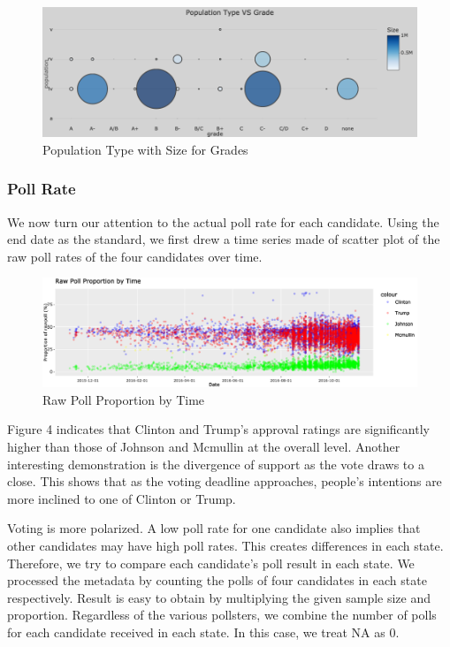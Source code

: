 \documentclass[
  11pt,
]{article}
\begin{document}
\begin{figure}
\centering
\includegraphics{./Figures/popChart.png}
\caption{Population Type with Size for Grades}
\end{figure}

\hypertarget{poll-rate}{%
\subsubsection{Poll Rate}\label{poll-rate}}

We now turn our attention to the actual poll rate for each candidate.
Using the end date as the standard, we first drew a time series made of
scatter plot of the raw poll rates of the four candidates over time.

\begin{figure}
\centering
\includegraphics{./Figures/dotChart.png}
\caption{Raw Poll Proportion by Time}
\end{figure}

Figure 4 indicates that Clinton and Trump's approval ratings are
significantly higher than those of Johnson and Mcmullin at the overall
level. Another interesting demonstration is the divergence of support as
the vote draws to a close. This shows that as the voting deadline
approaches, people's intentions are more inclined to one of Clinton or
Trump.

Voting is more polarized. A low poll rate for one candidate also implies
that other candidates may have high poll rates. This creates differences
in each state. Therefore, we try to compare each candidate's poll result
in each state. We processed the metadata by counting the polls of four
candidates in each state respectively. Result is easy to obtain by
multiplying the given sample size and proportion. Regardless of the
various pollsters, we combine the number of polls for each candidate
received in each state. In this case, we treat NA as 0.
\end{document}
